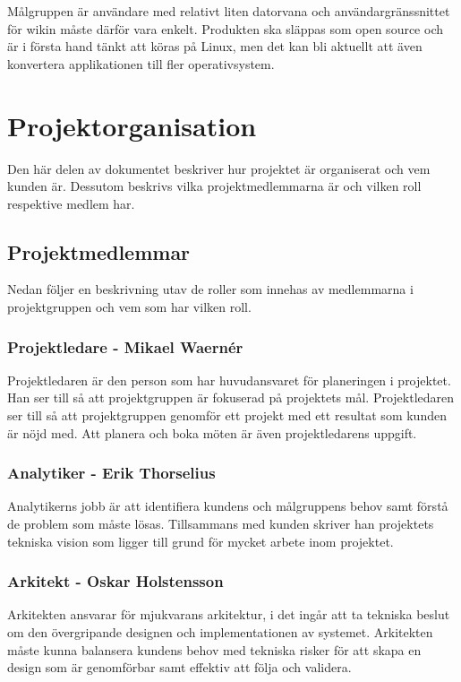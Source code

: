 Målgruppen är användare med relativt liten datorvana och användargränssnittet för wikin måste därför vara enkelt. Produkten ska släppas som open source och är i första hand tänkt att köras på Linux, men det kan bli aktuellt att även konvertera applikationen till fler operativsystem.

\section{Projektorganisation}
Den här delen av dokumentet beskriver hur projektet är organiserat och vem kunden är. Dessutom beskrivs vilka projektmedlemmarna är och vilken roll respektive medlem har.

\subsection{Projektmedlemmar}
Nedan följer en beskrivning utav de roller som innehas av medlemmarna i projektgruppen och vem som har vilken roll.

\subsubsection*{Projektledare - Mikael Waernér}
Projektledaren är den person som har huvudansvaret för planeringen i projektet. Han ser till så att projektgruppen är fokuserad på projektets mål. Projektledaren ser till så att projektgruppen genomför ett projekt med ett resultat som kunden är nöjd med. Att planera och boka möten är även projektledarens uppgift.

\subsubsection*{Analytiker - Erik Thorselius}
Analytikerns jobb är att identifiera kundens och målgruppens behov samt förstå de problem som måste lösas. Tillsammans med kunden skriver han projektets tekniska vision som ligger till grund för mycket arbete inom projektet.

\subsubsection*{Arkitekt - Oskar Holstensson}
Arkitekten ansvarar för mjukvarans arkitektur, i det ingår att ta tekniska beslut om den övergripande designen och implementationen av systemet. Arkitekten måste kunna balansera kundens behov med tekniska risker för att skapa en design som är genomförbar samt effektiv att följa och validera.

